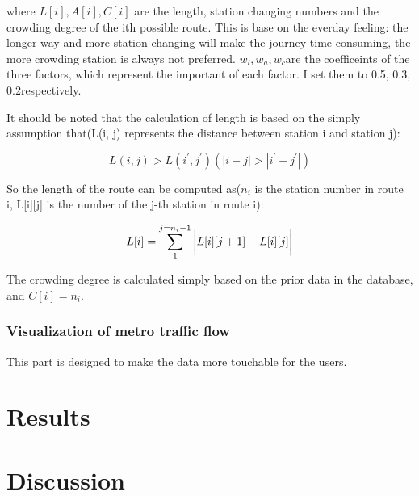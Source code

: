 \documentclass{ctexart}
\begin{document}
  where $L[i], A[i], C[i]$ are the length, station changing numbers and the crowding degree of the 
  ith possible route. This is base on the everday feeling: the longer way and more station changing 
  will make the journey time consuming, the more crowding station is always not preferred.
  $w_l,w_a,w_c$are the coefficeints of the three factors, which represent the important of each 
  factor. I set them to  0.5, 0.3, 0.2respectively. 

  It should be noted that the calculation of length is based on the simply assumption that(L(i, j)
  represents the distance between station i and station j):

  \begin{equation}
    L(i, j) > L(i^{'}, j^{'}) (|i - j| > |i^{'} - j^{'}|)    
  \end{equation}

   So the length of the route can be computed as($n_i$ is the station number in route i, L[i][j] is the number of the j-th station 
   in route i):

  \begin{equation}
    L[i] = \sum_{1}^{j = n_i - 1}{\bigg{|}L[i][j+1] - L[i][j]\bigg{|}}
  \end{equation}

  The crowding degree is calculated simply based on the prior data in  the database, and $C[i] = n_i$.

  \subsubsection{Visualization of metro traffic flow}
  This part is designed to make the data more touchable for the users.


\section{Results}




\section{Discussion}
\end{document}
